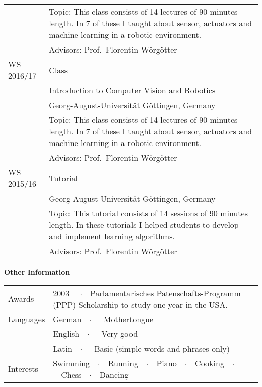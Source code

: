 \hspace{0.5cm}\begin{tabular}{ p{2.5cm} p{10.3cm} }
                & Topic: This class consists of 14 lectures of 90 minutes length. In 7 of these I taught about sensor, actuators and machine learning in a robotic environment.\\
                & Advisors: Prof.~Florentin W\"org\"otter\vspace{0.5cm}\\
%
  WS 2016/17    & Class\\
                & Introduction to Computer Vision and Robotics\\
                & Georg-August-Universit\"at G\"ottingen, Germany\\
                & Topic: This class consists of 14 lectures of 90 minutes length. In 7 of these I taught about sensor, actuators and machine learning in a robotic environment.\\
                & Advisors: Prof.~Florentin W\"org\"otter\vspace{0.5cm}\\
%
  WS 2015/16    & Tutorial\\                
                & Georg-August-Universit\"at G\"ottingen, Germany\\
                & Topic: This tutorial consists of 14 sessions of 90 minutes length. In these tutorials I helped students to develop and implement learning algorithms.\\
                & Advisors: Prof.~Florentin W\"org\"otter\vspace{0.5cm}\\
\end{tabular}


\vspace{0.5cm}\textbf{Other Information}

\hspace{0.5cm}\begin{tabular}{ p{2.5cm} p{10.3cm} }
  Awards        & 2003 \ \ $\cdotp$\ \ Parlamentarisches Patenschafts-Programm (PPP) Scholarship to study one year in the USA.\vspace{0.5cm}\\
  Languages     & German\ \ $\cdotp$\ \ \ Mothertongue\\
                & English\ \ $\cdotp$\ \ \ Very good\\
                & Latin\ \ $\cdotp$\ \ \ Basic (simple words and phrases only)\vspace{0.5cm}\\
 Interests      & Swimming\ \ $\cdotp$\ \ Running\ \ $\cdotp$\ \  Piano\ \ $\cdotp$\ \ Cooking\ \ $\cdotp$\ \ Chess\ \ $\cdotp$\ \ Dancing\vspace{0.5cm}\\
\end{tabular}

